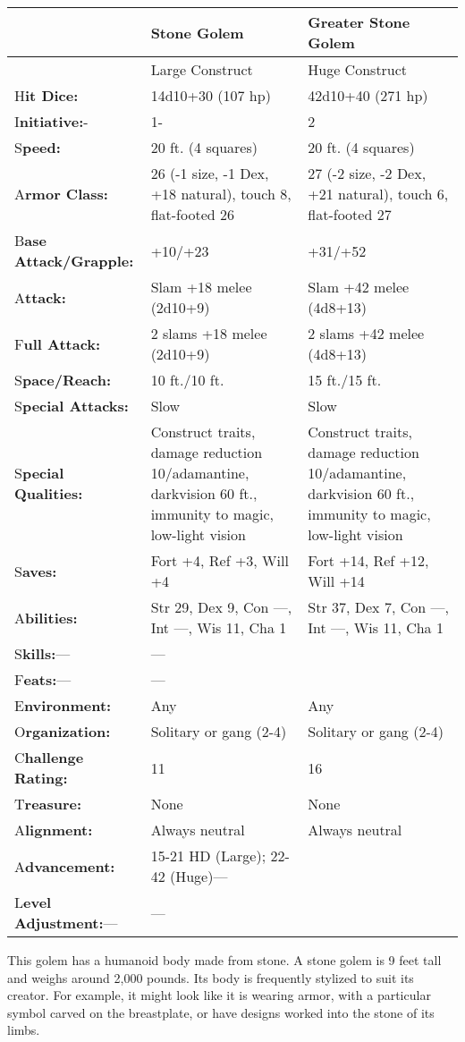 \documentclass{article}
\begin{document}
\begin{tabular}{|>{\raggedright}p{47pt}|>{\raggedright}p{133pt}|>{\raggedright}p{133pt}|}
\hline
  & S\textbf{tone Golem} & G\textbf{reater Stone Golem}\tabularnewline
\hline
  & Large Construct & Huge Construct\tabularnewline
\hline
H\textbf{it Dice:} & 14d10+30 (107 hp) & 42d10+40 (271 hp)\tabularnewline
\hline
I\textbf{nitiative:}- & 1- & 2\tabularnewline
\hline
S\textbf{peed:} & 20 ft. (4 squares) & 20 ft. (4 squares)\tabularnewline
\hline
A\textbf{rmor Class:} & 26 (-1 size, -1 Dex, +18 natural), touch 8, flat-footed 
26 & 27 (-2 size, -2 Dex, +21 natural), touch 6, flat-footed 27\tabularnewline
\hline
B\textbf{ase Attack/Grapple:} & +10/+23 & +31/+52\tabularnewline
\hline
A\textbf{ttack:} & Slam +18 melee (2d10+9) & Slam +42 melee (4d8+13)\tabularnewline
\hline
F\textbf{ull Attack:} & 2 slams +18 melee (2d10+9) & 2 slams +42 melee (4d8+13)\tabularnewline
\hline
S\textbf{pace/Reach:} & 10 ft./10 ft. & 15 ft./15 ft.\tabularnewline
\hline
S\textbf{pecial Attacks:} & Slow & Slow\tabularnewline
\hline
S\textbf{pecial Qualities:} & Construct traits, damage reduction 10/adamantine, 
darkvision 60 ft., immunity to magic, low-light vision & Construct traits, damage 
reduction 10/adamantine, darkvision 60 ft., immunity to magic, low-light vision\tabularnewline
\hline
S\textbf{aves:} & Fort +4, Ref +3, Will +4 & Fort +14, Ref +12, Will +14\tabularnewline
\hline
A\textbf{bilities:} & Str 29, Dex 9, Con ---, Int ---, Wis 11, Cha 1 & Str 37, 
Dex 7, Con ---, Int ---, Wis 11, Cha 1\tabularnewline
\hline
S\textbf{kills:}--- & --- & \tabularnewline
\hline
F\textbf{eats:}--- & --- & \tabularnewline
\hline
E\textbf{nvironment:} & Any & Any\tabularnewline
\hline
O\textbf{rganization:} & Solitary or gang (2-4) & Solitary or gang (2-4)\tabularnewline
\hline
C{\small{}\textbf{hallenge Rating:}} & 1{\small{}1} & 16\tabularnewline
\hline
T\textbf{reasure:} & None & None\tabularnewline
\hline
A\textbf{lignment:} & Always neutral & Always neutral\tabularnewline
\hline
A\textbf{dvancement:} & 15-21 HD (Large); 22-42 (Huge)--- & \tabularnewline
\hline
L\textbf{evel Adjustment:}--- & --- & \tabularnewline
\hline
\end{tabular}

This golem has a humanoid body made from stone. A stone golem is 9 feet tall and 
weighs around 2,000 pounds. Its body is frequently stylized to suit its creator. 
For example, it might look like it is wearing armor, with a particular symbol carved 
on the breastplate, or have designs worked into the stone of its limbs.
\end{document}
